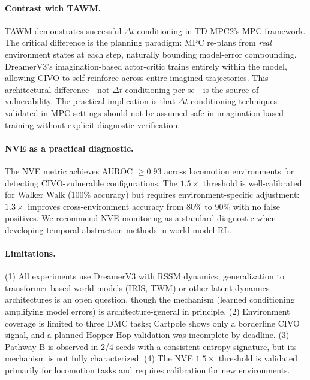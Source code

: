 \documentclass[10pt,letterpaper]{article}
\newcommand{\dt}{\Delta t}
\begin{document}
\paragraph{Contrast with TAWM.}
TAWM demonstrates successful $\dt$-conditioning in TD-MPC2's MPC framework.
The critical difference is the planning paradigm: MPC re-plans from \emph{real} environment states at each step, naturally bounding model-error compounding.
DreamerV3's imagination-based actor-critic trains entirely within the model, allowing CIVO to self-reinforce across entire imagined trajectories.
This architectural difference---not $\dt$-conditioning per se---is the source of vulnerability.
The practical implication is that $\dt$-conditioning techniques validated in MPC settings should not be assumed safe in imagination-based training without explicit diagnostic verification.

\paragraph{NVE as a practical diagnostic.}
The NVE metric achieves AUROC $\geq 0.93$ across locomotion environments for detecting CIVO-vulnerable configurations.
The $1.5\times$ threshold is well-calibrated for Walker Walk (100\% accuracy) but requires environment-specific adjustment: $1.3\times$ improves cross-environment accuracy from 80\% to 90\% with no false positives.
We recommend NVE monitoring as a standard diagnostic when developing temporal-abstraction methods in world-model RL.

\paragraph{Limitations.}
(1) All experiments use DreamerV3 with RSSM dynamics; generalization to transformer-based world models (IRIS, TWM) or other latent-dynamics architectures is an open question, though the mechanism (learned conditioning amplifying model errors) is architecture-general in principle.
(2) Environment coverage is limited to three DMC tasks; Cartpole shows only a borderline CIVO signal, and a planned Hopper Hop validation was incomplete by deadline.
(3) Pathway B is observed in 2/4 seeds with a consistent entropy signature, but its mechanism is not fully characterized.
(4) The NVE $1.5\times$ threshold is validated primarily for locomotion tasks and requires calibration for new environments.

\end{document}
